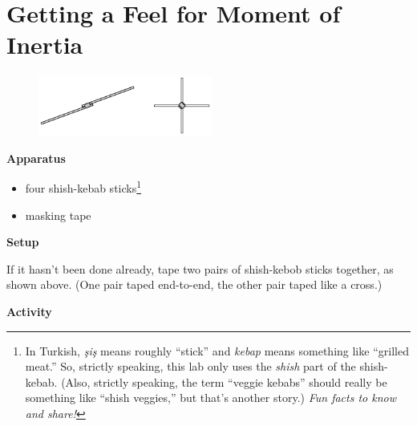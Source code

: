 \section{Getting a Feel for Moment of Inertia}

\makelabheader %

\begin{figure}
    \vspace{-0.3in}
    \includegraphics[width=0.51\textwidth]{moment_inertia_feel/stick_pics1.eps}
\end{figure}

\bigskip
\textbf{Apparatus}

\begin{itemize}[nosep]
\item four shish-kebab sticks\footnote{In Turkish, \textit{\c{s}i\c{s}} means roughly ``stick'' and \textit{kebap} means something like ``grilled meat.''  So, strictly speaking, this lab only uses the \textit{shish} part of the shish-kebab.  (Also, strictly speaking, the term ``veggie kebabs'' should really be something like ``shish veggies,'' but that's another story.)  \textit{Fun facts to know and share!}}
\item masking tape
\end{itemize}

\bigskip
\textbf{Setup}

If it hasn't been done already, tape two pairs of shish-kebob sticks together, as shown above.  (One pair taped end-to-end, the other pair taped like a cross.)

\bigskip
\textbf{Activity}


